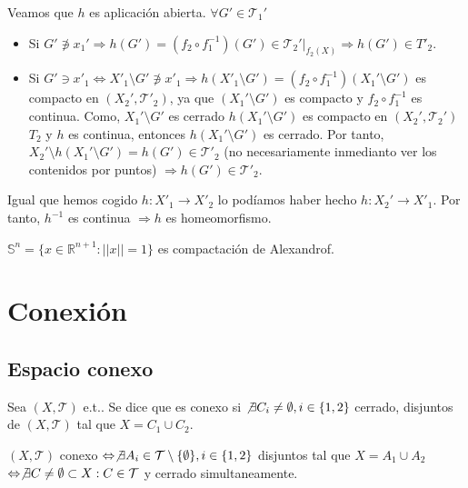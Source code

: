 \begin{dem}
\begin{enumerate}[label=(\roman*)]
      Veamos que $h$ es aplicación abierta. $\forall G' \in \mathcal{T}_{1}'$
      \begin{itemize}
        \item Si $G' \not \ni x_{1}' \Rightarrow h(G') = (f_{2} \circ f_{1}^{-1})(G') \in \mathcal{T}_{2}'|_{f_{2}(X)} \Rightarrow h(G') \in T'_{2}$.
        \item Si $G' \ni x'_{1} \Leftrightarrow X'_{1} \setminus G' \not \ni x'_{1} \Rightarrow h(X'_{1} \setminus G') = (f_{2} \circ f_{1}^{-1}) (X_{1}' \setminus G')$ es compacto en $(X_{2}', \mathcal{T}'_{2})$, ya que $(X_{1}' \setminus G')$ es compacto y $f_{2} \circ f_{1}^{-1}$ es continua. Como, $X_{1}' \setminus G'$ es cerrado $h(X_{1}' \setminus G')$ es compacto en $( X_{2}', \mathcal{T}_{2}' )$ $T_{2}$ y $h$ es continua, entonces $h(X_{1}' \setminus G')$ es cerrado. Por tanto, $X_{2}' \setminus h(X_{1}' \setminus G') = h(G') \in \mathcal{T}'_{2}$ (no necesariamente inmedianto ver los contenidos por puntos) $\Rightarrow h(G') \in \mathcal{T}'_{2}$.
      \end{itemize}
      Igual que hemos cogido $h : X'_{1} \to X'_{2}$ lo podíamos haber hecho $h : X_{2}' \to X'_{1}$. Por tanto, $h^{-1}$ es continua $\Rightarrow h$ es homeomorfismo.
  \end{enumerate}
\end{dem}

\begin{ejm}
  $\mathbb{S}^{n} = \{ x \in \mathbb{R}^{n+1} : ||x|| = 1 \}$ es compactación de Alexandrof.
\end{ejm}

\chapter{Conexión}

\section{Espacio conexo}

\begin{defn}[Conexo]
  Sea $( X, \mathcal{T} )$ e.t.. Se dice que es conexo si $\not \exists C_{i} \neq \emptyset, i \in \{ 1, 2 \}$ cerrado, disjuntos de $( X, \mathcal{T} )$ tal que $X = C_{1} \cup C_{2}$.
\end{defn}

\begin{obs}
  $( X, \mathcal{T} )$ conexo $\Leftrightarrow \not \exists A_{i} \in \mathcal{T} \setminus \{ \emptyset \}, i \in \{ 1, 2 \} $ disjuntos tal que $X = A_{1} \cup A_{2}$ $\Leftrightarrow \not \exists C \neq \emptyset \subset X : C \in \mathcal{T}$ y cerrado simultaneamente.
\end{obs} 

